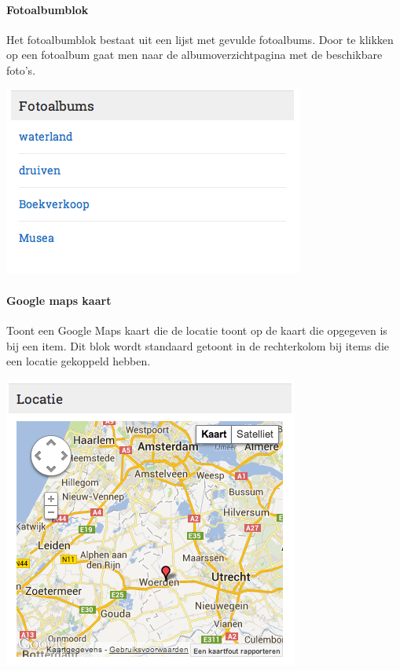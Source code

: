 \paragraph{Fotoalbumblok}\label{fotoalbumblok}

Het fotoalbumblok bestaat uit een lijst met gevulde fotoalbums. Door te klikken op een fotoalbum gaat men naar de albumoverzichtpagina met de beschikbare foto's.

\begin{center}
	\includegraphics[scale=0.5]{img/blokken/fotoalbum.png}
\end{center}

\paragraph{Google maps kaart}

Toont een Google Maps kaart die de locatie toont op de kaart die opgegeven is bij een item. Dit blok wordt standaard getoont in de rechterkolom bij items die een locatie gekoppeld hebben.

\begin{center}
	\includegraphics[scale=0.5]{img/blokken/googlemaps.png}
\end{center}

